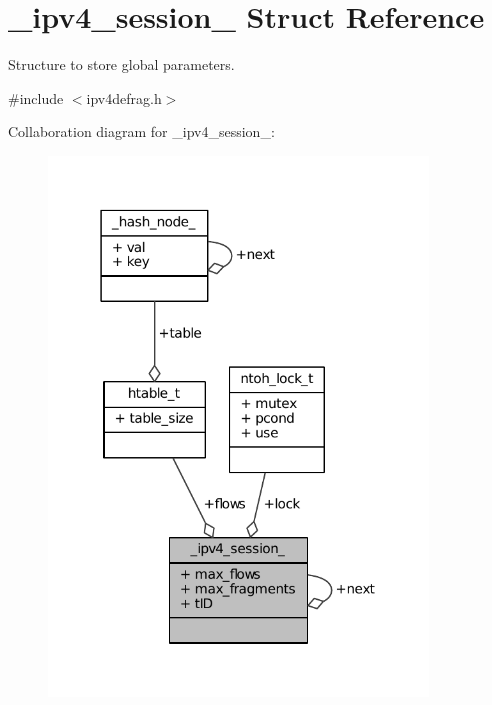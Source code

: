 \hypertarget{struct__ipv4__session__}{\section{\-\_\-ipv4\-\_\-session\-\_\- Struct Reference}
\label{struct__ipv4__session__}
}


Structure to store global parameters.  




{\ttfamily \#include $<$ipv4defrag.\-h$>$}



Collaboration diagram for \-\_\-ipv4\-\_\-session\-\_\-\-:
\nopagebreak
\begin{figure}[H]
\begin{center}
\leavevmode
\includegraphics[width=286pt]{struct__ipv4__session____coll__graph}
\end{center}
\end{figure}
